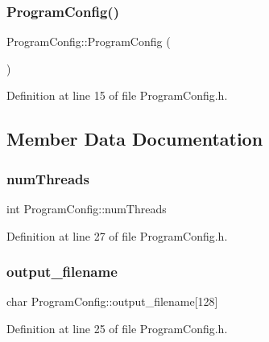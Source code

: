 \subsubsection{\texorpdfstring{Program\+Config()}{ProgramConfig()}}
{\footnotesize\ttfamily Program\+Config\+::\+Program\+Config (\begin{DoxyParamCaption}{ }\end{DoxyParamCaption})\hspace{0.3cm}{\ttfamily [inline]}}



Definition at line 15 of file Program\+Config.\+h.



\subsection{Member Data Documentation}
\mbox{\label{struct_program_config_ad3a77eb9d22a5ab56326a798cc8428d2}} 
\subsubsection{\texorpdfstring{num\+Threads}{numThreads}}
{\footnotesize\ttfamily int Program\+Config\+::num\+Threads}



Definition at line 27 of file Program\+Config.\+h.

\mbox{\label{struct_program_config_a6673c608d617371fda38de237c9cab1e}} 
\subsubsection{\texorpdfstring{output\+\_\+filename}{output\_filename}}
{\footnotesize\ttfamily char Program\+Config\+::output\+\_\+filename\mbox{[}128\mbox{]}}



Definition at line 25 of file Program\+Config.\+h.

\mbox{\label{struct_program_config_a2e5a432549c56826d91022c2acd4ad71}} 
